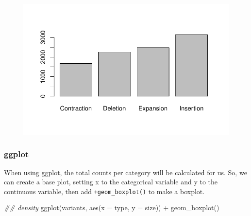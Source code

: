 \documentclass[
  letterpaper,
  DIV=11,
  numbers=noendperiod]{scrreprt}
\newenvironment{Shaded}{\begin{snugshade}}{\end{snugshade}}
\newcommand{\AttributeTok}[1]{\textcolor[rgb]{0.40,0.45,0.13}{#1}}
\newcommand{\DocumentationTok}[1]{\textcolor[rgb]{0.37,0.37,0.37}{\textit{#1}}}
\newcommand{\FunctionTok}[1]{\textcolor[rgb]{0.28,0.35,0.67}{#1}}
\newcommand{\NormalTok}[1]{\textcolor[rgb]{0.00,0.23,0.31}{#1}}
\newcommand{\SpecialCharTok}[1]{\textcolor[rgb]{0.37,0.37,0.37}{#1}}
\begin{document}
\begin{figure}[H]

{\centering \includegraphics{scripts/02_dataViz/class3_files/figure-pdf/unnamed-chunk-18-1.pdf}

}

\end{figure}

\hypertarget{ggplot-2}{%
\subsubsection{ggplot}\label{ggplot-2}}

When using ggplot, the total counts per category will be calculated for
us. So, we can create a base plot, setting x to the categorical variable
and y to the continuous variable, then add \texttt{+geom\_boxplot()} to
make a boxplot.

\begin{Shaded}
\begin{Highlighting}[]
\DocumentationTok{\#\# density}
\FunctionTok{ggplot}\NormalTok{(variants, }\FunctionTok{aes}\NormalTok{(}\AttributeTok{x =}\NormalTok{ type, }\AttributeTok{y =}\NormalTok{ size)) }\SpecialCharTok{+}
  \FunctionTok{geom\_boxplot}\NormalTok{()}
\end{Highlighting}
\end{Shaded}
\end{document}
